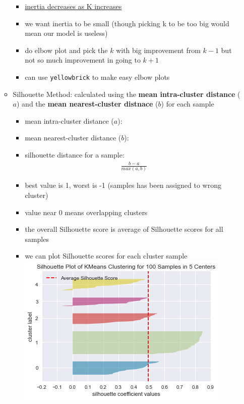 \documentclass[10.5pt,a4paper, fleqn, dvipsnames]{article}
\begin{document}
\begin{itemize}
\begin{itemize}
        \begin{itemize}[leftmargin = 2em]
            \item \ul{inertia decreases as K increases} 
            \item we want inertia to be small (though picking k to be too big would mean our model is useless)
            \item do elbow plot and pick the $k$ with big improvement from $k-1$ but not so much improvement in going to $k+1$
            \item can use \lstinline{yellowbrick} to make easy elbow plots
        \end{itemize}
        \item Silhouette Method: calculated using the \textbf{mean intra-cluster distance} ($a$) and the \textbf{mean nearest-cluster distnace} ($b$) for each sample 
        \begin{itemize}[leftmargin = 2em]
            \item mean intra-cluster distance ($a$):
            \item mean nearest-cluster distance ($b$):
            \item silhouette distance for a sample:
            \begin{align*}
                \frac{b-a}{max(a,b)}
            \end{align*}
            \item best value is 1, worst is -1 (samples has been assigned to wrong cluster)
            \item value near 0 means overlapping clusters 
            \item the overall Silhouette score is average of Silhouette scores for all samples 
            \item we can plot Silhouette scores for each cluster sample \\
            \includegraphics[scale = 0.7]{silhouette-plot.png}

\end{itemize}
\end{itemize}
\end{itemize}
\end{document}
